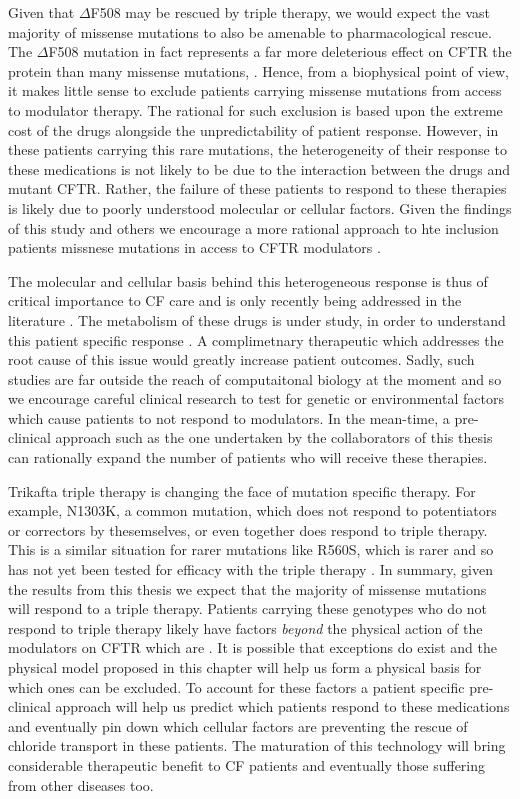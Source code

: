 Given that $\Delta$F508 may be rescued by triple therapy, we would expect the vast majority of missense mutations to also be amenable to pharmacological rescue. The $\Delta$F508 mutation in fact represents a far more deleterious effect on CFTR the protein than many missense mutations, \cite{bahia2021}. Hence, from a biophysical point of view, it makes little sense to exclude patients carrying missense mutations from access to modulator therapy. The rational for such exclusion is based upon the extreme cost of the drugs alongside the unpredictability of patient response. However, in these patients carrying this rare mutations, the heterogeneity of their response to these medications is not likely to be due to the interaction between the drugs and mutant CFTR. Rather, the failure of these patients to respond to these therapies is likely due to poorly understood molecular or cellular factors. Given the findings of this study and others we encourage a more rational approach to hte inclusion patients missnese mutations in access to CFTR modulators \cite{}. 

The molecular and cellular basis behind this heterogeneous response is thus of critical importance to CF care and is only recently being addressed in the literature \cite{}. The metabolism of these drugs is under study, in order to understand this patient specific response \cite{hanafin2021}. A complimetnary therapeutic which addresses the root cause of this issue would greatly increase patient outcomes. Sadly, such studies are far outside the reach of computaitonal biology at the moment and so we encourage careful clinical research to test for genetic or environmental factors which cause patients to not respond to modulators. In the mean-time, a pre-clinical approach such as the one undertaken by the collaborators of this thesis can rationally expand the number of patients who will receive these therapies.

Trikafta triple therapy is changing the face of mutation specific therapy. For example, N1303K, a common mutation, which does not respond to potentiators or correctors by thesemselves, or even together \cite{} does respond to triple therapy. This is a similar situation for rarer mutations like R560S, which is rarer and so has not yet been tested for efficacy with the triple therapy \cite{awatade2019}. In summary, given the results from this thesis we expect that the majority of missense mutations will respond to a triple therapy. Patients carrying these genotypes who do not respond to triple therapy likely have factors \textit{beyond} the physical action of the modulators on CFTR which are . It is possible that exceptions do exist and the physical model proposed in this chapter will help us form a physical basis for which ones can be excluded. To account for these factors a patient specific pre-clinical approach will help us predict which patients respond to these medications and eventually pin down which cellular factors are preventing the rescue of chloride transport in these patients. The maturation of this technology will bring considerable therapeutic benefit to CF patients and eventually those suffering from other diseases too.

